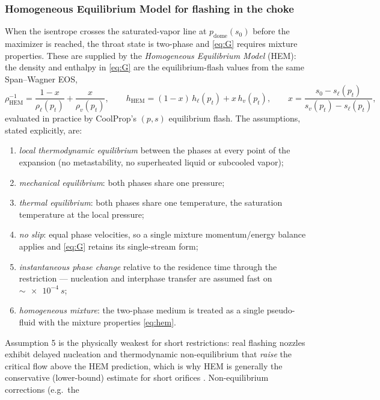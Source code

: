 \documentclass[11pt]{article}
\begin{document}
\subsubsection{Homogeneous Equilibrium Model for flashing in the choke}
\label{sec:hem-model}

When the isentrope crosses the saturated-vapor line at
$p_{\mathrm{dome}}(s_0)$ before the maximizer is reached, the throat
state is two-phase and \cref{eq:G} requires mixture properties. These
are supplied by the \emph{Homogeneous Equilibrium Model} (HEM): the
density and enthalpy in \cref{eq:G} are the equilibrium-flash values
from the same Span--Wagner EOS,
\begin{equation}
\rho_{\mathrm{HEM}}^{-1} = \frac{1-x}{\rho_\ell(p_t)}
 + \frac{x}{\rho_v(p_t)},
\qquad
h_{\mathrm{HEM}} = (1-x)\,h_\ell(p_t) + x\,h_v(p_t),
\qquad
x = \frac{s_0 - s_\ell(p_t)}{s_v(p_t) - s_\ell(p_t)},
\label{eq:hem}
\end{equation}
evaluated in practice by CoolProp's $(p,s)$ equilibrium flash. The
assumptions, stated explicitly, are:
\begin{enumerate}
\item \emph{local thermodynamic equilibrium} between the phases at
every point of the expansion (no metastability, no superheated liquid
or subcooled vapor);
\item \emph{mechanical equilibrium}: both phases share one pressure;
\item \emph{thermal equilibrium}: both phases share one temperature,
the saturation temperature at the local pressure;
\item \emph{no slip}: equal phase velocities, so a single mixture
momentum/energy balance applies and \cref{eq:G} retains its
single-stream form;
\item \emph{instantaneous phase change} relative to the residence time
through the restriction --- nucleation and interphase transfer are
assumed fast on $\sim\SI{e-4}{s}$;
\item \emph{homogeneous mixture}: the two-phase medium is treated as a
single pseudo-fluid with the mixture properties \cref{eq:hem}.
\end{enumerate}
Assumption 5 is the physically weakest for short restrictions: real
flashing nozzles exhibit delayed nucleation and thermodynamic
non-equilibrium that \emph{raise} the critical flow above the HEM
prediction, which is why HEM is generally the conservative
(lower-bound) estimate for short orifices
\citep{starkman1964,henry1971}. Non-equilibrium corrections (e.g.\ the
\end{document}
